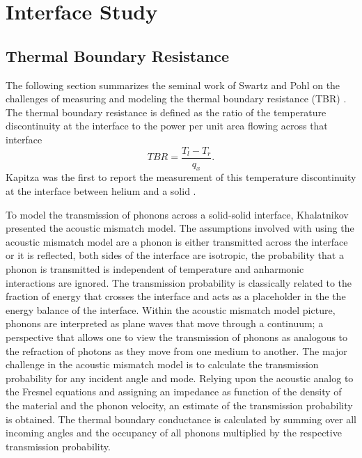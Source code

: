 \chapter{Interface Study}\label{CHP:Interface}

\section{Thermal Boundary Resistance}
The following section summarizes the seminal work of Swartz and Pohl on the challenges of measuring and modeling the thermal boundary resistance (TBR) \cite{RevModPhys.61.605}. The thermal boundary resistance is defined as the ratio of the temperature discontinuity at the interface to the power per unit area flowing across that interface
\begin{equation}
TBR=\frac{T_l-T_r}{q_x}.
\end{equation}
Kapitza was the first to report the measurement of this temperature discontinuity at the interface between helium and a solid \cite{kapitza1941study}.

To model the transmission of phonons across a solid-solid interface, Khalatnikov \cite{khalatnikov1973theory} presented the acoustic mismatch model. The assumptions involved with using the acoustic mismatch model are a phonon is either transmitted across the interface or it is reflected, both sides of the interface are isotropic, the probability that a phonon is transmitted is independent of temperature and anharmonic interactions are ignored. The transmission probability is classically related to the fraction of energy that crosses the interface and acts as a placeholder in the the energy balance of the interface. Within the acoustic mismatch model picture, phonons are interpreted as plane waves that move through a continuum; a perspective that allows one to view the transmission of phonons as analogous to the refraction of photons as they move from one medium to another. The major challenge in the acoustic mismatch model is to calculate the transmission probability for any incident angle and mode. Relying upon the acoustic analog to the Fresnel equations and assigning an impedance as function of the density of the material and the phonon velocity, an estimate of the transmission probability is obtained. The thermal boundary conductance is calculated by summing over all incoming angles and the occupancy of all phonons multiplied by the respective transmission probability.

